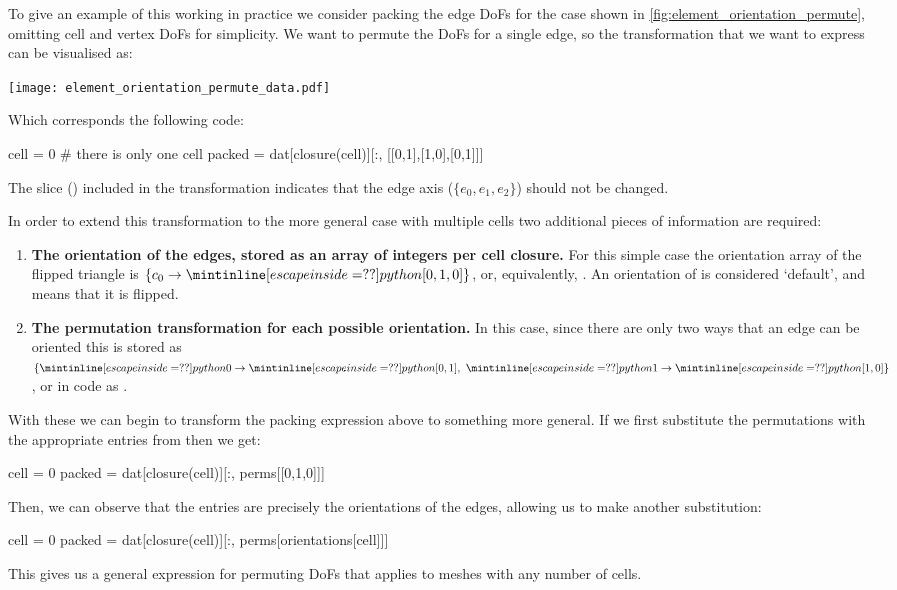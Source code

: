 \documentclass[thesis]{subfiles}
\begin{document}
To give an example of this working in practice we consider packing the edge DoFs for the case shown in \cref{fig:element_orientation_permute}, omitting cell and vertex DoFs for simplicity.
We want to permute the DoFs for a single edge, so the transformation that we want to express can be visualised as:
\begin{center}
  \texttt{[image: element\_orientation\_permute\_data.pdf]}
\end{center}
Which corresponds the following  code:
\begin{pyinline}
  cell = 0  # there is only one cell
  packed = dat[closure(cell)][:, [[0,1],[1,0],[0,1]]]
\end{pyinline}
The slice (\pycode{:}) included in the transformation indicates that the edge axis ($\{e_0,e_1,e_2\}$) should not be changed.

In order to extend this transformation to the more general case with multiple cells two additional pieces of information are required:
\begin{enumerate}
  \item
    \textbf{The orientation of the edges, stored as an array of integers per cell closure.}
    For this simple case the orientation array of the flipped triangle is $\{ c_0 \to \pycode{[0,1,0]} \}$, or, equivalently, .
    An orientation of  is considered `default', and  means that it is flipped.

  \item
    \textbf{The permutation transformation for each possible orientation.}
    In this case, since there are only two ways that an edge can be oriented this is stored as $\{ \pycode{0} \to \pycode{[0,1]},\ \pycode{1} \to \pycode{[1,0]} \}$, or in code as .
\end{enumerate}

With these we can begin to transform the packing expression above to something more general.
If we first substitute the permutations \pycode{[[0,1],[1,0],[0,1]]} with the appropriate entries from  then we get:
\begin{pyinline}
  cell = 0
  packed = dat[closure(cell)][:, perms[[0,1,0]]]
\end{pyinline}
Then, we can observe that the entries \pycode{[0,1,0]} are precisely the orientations of the edges, allowing us to make another substitution:
\begin{pyinline}
  cell = 0
  packed = dat[closure(cell)][:, perms[orientations[cell]]]
\end{pyinline}
This gives us a general expression for permuting DoFs that applies to meshes with any number of cells.
\end{document}
